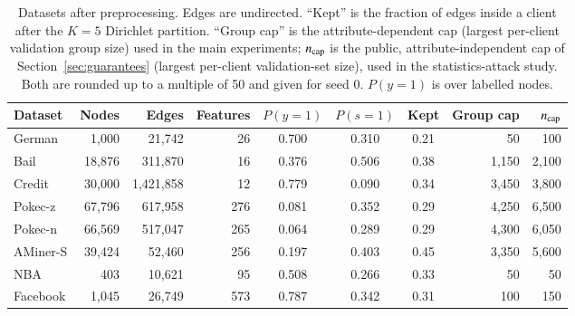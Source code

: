 \begin{table}[tbp]
\centering
\footnotesize
\setlength{\tabcolsep}{3pt}
\caption{Datasets after preprocessing. Edges are undirected. ``Kept'' is the fraction of edges inside a client after the $K=5$ Dirichlet partition. ``Group cap'' is the attribute-dependent cap (largest per-client validation group size) used in the main experiments; $n_{\mathrm{cap}}$ is the public, attribute-independent cap of Section~\ref{sec:guarantees} (largest per-client validation-set size), used in the statistics-attack study. Both are rounded up to a multiple of 50 and given for seed 0. $P(y{=}1)$ is over labelled nodes.}\label{tab:data}
\begin{tabular}{lrrrcccrr}
\toprule
Dataset & Nodes & Edges & Features & $P(y{=}1)$ & $P(s{=}1)$ & Kept & Group cap & $n_{\mathrm{cap}}$ \\
\midrule
German   & 1{,}000  & 21{,}742      & 26  & 0.700 & 0.310 & 0.21 & 50 & 100 \\
Bail     & 18{,}876 & 311{,}870     & 16  & 0.376 & 0.506 & 0.38 & 1{,}150 & 2{,}100 \\
Credit   & 30{,}000 & 1{,}421{,}858 & 12  & 0.779 & 0.090 & 0.34 & 3{,}450 & 3{,}800 \\
Pokec-z  & 67{,}796 & 617{,}958     & 276 & 0.081 & 0.352 & 0.29 & 4{,}250 & 6{,}500 \\
Pokec-n  & 66{,}569 & 517{,}047     & 265 & 0.064 & 0.289 & 0.29 & 4{,}300 & 6{,}050 \\
AMiner-S & 39{,}424 & 52{,}460      & 256 & 0.197 & 0.403 & 0.45 & 3{,}350 & 5{,}600 \\
NBA      & 403      & 10{,}621      & 95  & 0.508 & 0.266 & 0.33 & 50 & 50 \\
Facebook & 1{,}045  & 26{,}749      & 573 & 0.787 & 0.342 & 0.31 & 100 & 150 \\
\bottomrule
\end{tabular}
\end{table}

